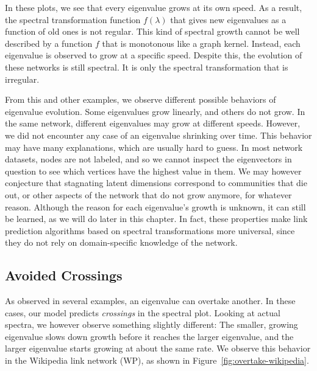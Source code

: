 \documentclass[11pt,a4paper]{book}
\begin{document}
In these plots, we see that every eigenvalue grows at its own speed.  As
a result, the spectral transformation function $f(\lambda)$ that gives
new eigenvalues as a function of old ones is not regular.
This kind of spectral growth cannot be well described by a function
$f$ that is monotonous like a graph kernel. 
Instead, each eigenvalue is observed to grow at a
specific speed.
Despite this, the evolution of these networks is still spectral. 
It is only the spectral transformation that is irregular. 

From this and other examples, we observe different possible behaviors of
eigenvalue evolution.  Some eigenvalues grow linearly, and others do not
grow.  In the same network, different eigenvalues may grow at different
speeds.  However, we did not encounter any case of an eigenvalue
shrinking over time.  
This behavior may have many explanations, which are usually hard to
guess. 
In most network datasets, nodes are not labeled, and so we cannot
inspect the eigenvectors in question to see which vertices have the
highest value in them. We may however conjecture that stagnating latent
dimensions correspond to communities that die out, or other aspects of
the network that do not grow anymore, for whatever reason. 
Although the reason for each eigenvalue's growth is unknown, it
can still be learned, as we will do later in this chapter.  In fact, these
properties make link prediction algorithms based on spectral
transformations more universal, since they do not rely on
domain-specific knowledge of the network. 

\subsection{Avoided Crossings}

As observed in several examples, an eigenvalue can overtake another.
In these cases, our model predicts \emph{crossings} in the spectral
plot.  Looking at 
actual spectra, we however observe something slightly different:  The smaller,
growing eigenvalue slows down growth before it reaches the larger
eigenvalue, and the larger eigenvalue starts growing at about the same
rate.  We observe this behavior in the Wikipedia link network
(\textsf{WP}), as shown in Figure~\ref{fig:overtake-wikipedia}. 
\end{document}
